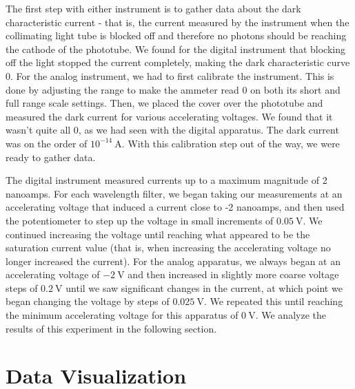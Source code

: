 \documentclass[prX,nofootinbib,notitlepage]{revtex4-1}
\begin{document}
The first step with either instrument is to gather data about the dark characteristic current - that is, the current measured by the instrument when the collimating light tube is blocked off and therefore no photons should be reaching the cathode of the phototube. We found for the digital instrument that blocking off the light stopped the current completely, making the dark characteristic curve 0. For the analog instrument, we had to first calibrate the instrument. This is done by adjusting the range to make the ammeter read 0 on both its short and full range scale settings. Then, we placed the cover over the phototube and measured the dark current for various accelerating voltages. We found that it wasn't quite all 0, as we had seen with the digital apparatus. The dark current was on the order of $10^{-14}~\text{A}$. With this calibration step out of the way, we were ready to gather data.

The digital instrument measured currents up to a maximum magnitude of 2 nanoamps. For each wavelength filter, we began taking our measurements at an accelerating voltage that induced a current close to -2 nanoamps, and then used the potentiometer to step up the voltage in small increments of $0.05~\text{V}$. We continued increasing the voltage until reaching what appeared to be the saturation current value (that is, when increasing the accelerating voltage no longer increased the current). For the analog apparatus, we always began at an accelerating voltage of $-2~\text{V}$ and then increased in slightly more coarse voltage steps of $0.2~\text{V}$ until we saw significant changes in the current, at which point we began changing the voltage by steps of $0.025~\text{V}$. We repeated this until reaching the minimum accelerating voltage for this apparatus of $0~\text{V}$. We analyze the results of this experiment in the following section. 

\pagebreak

\section{Data Visualization}

\end{document}
